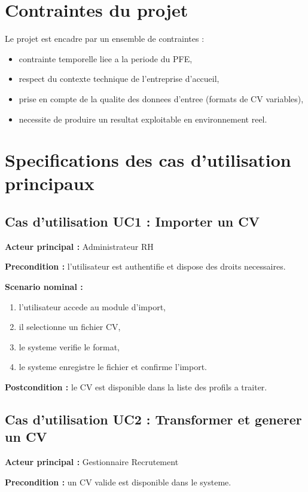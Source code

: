 \section{Contraintes du projet}
Le projet est encadre par un ensemble de contraintes :
\begin{itemize}[label=--]
    \item contrainte temporelle liee a la periode du PFE,
    \item respect du contexte technique de l'entreprise d'accueil,
    \item prise en compte de la qualite des donnees d'entree (formats de CV variables),
    \item necessite de produire un resultat exploitable en environnement reel.
\end{itemize}

\section{Specifications des cas d'utilisation principaux}
\subsection{Cas d'utilisation UC1 : Importer un CV}
\textbf{Acteur principal :} Administrateur RH

\textbf{Precondition :} l'utilisateur est authentifie et dispose des droits necessaires.

\textbf{Scenario nominal :}
\begin{enumerate}
    \item l'utilisateur accede au module d'import,
    \item il selectionne un fichier CV,
    \item le systeme verifie le format,
    \item le systeme enregistre le fichier et confirme l'import.
\end{enumerate}

\textbf{Postcondition :} le CV est disponible dans la liste des profils a traiter.

\subsection{Cas d'utilisation UC2 : Transformer et generer un CV}
\textbf{Acteur principal :} Gestionnaire Recrutement

\textbf{Precondition :} un CV valide est disponible dans le systeme.

